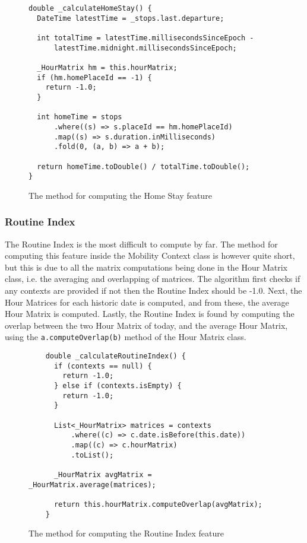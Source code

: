 \begin{figure}
    \centering
\begin{verbatim}
double _calculateHomeStay() {
  DateTime latestTime = _stops.last.departure;

  int totalTime = latestTime.millisecondsSinceEpoch -
      latestTime.midnight.millisecondsSinceEpoch;

  _HourMatrix hm = this.hourMatrix;
  if (hm.homePlaceId == -1) {
    return -1.0;
  }

  int homeTime = stops
      .where((s) => s.placeId == hm.homePlaceId)
      .map((s) => s.duration.inMilliseconds)
      .fold(0, (a, b) => a + b);

  return homeTime.toDouble() / totalTime.toDouble();
}
\end{verbatim}
    \caption{The method for computing the Home Stay feature}
    \label{fig:home-stay-code}
\end{figure}

\subsubsection{Routine Index}
The Routine Index is the most difficult to compute by far. The method for computing this feature inside the Mobility Context class is however quite short, but this is due to all the matrix computations being done in the Hour Matrix class, i.e. the averaging and overlapping of matrices. The algorithm first checks if any contexts are provided if not then the Routine Index should be -1.0. Next, the Hour Matrices for each historic date is computed, and from these, the average Hour Matrix is computed. Lastly, the Routine Index is found by computing the overlap between the two Hour Matrix of today, and the average Hour Matrix, using the \verb|a.computeOverlap(b)| method of the Hour Matrix class.

\begin{figure}
    \centering
    \begin{verbatim}
    double _calculateRoutineIndex() {
      if (contexts == null) {
        return -1.0;
      } else if (contexts.isEmpty) {
        return -1.0;
      }
    
      List<_HourMatrix> matrices = contexts
          .where((c) => c.date.isBefore(this.date))
          .map((c) => c.hourMatrix)
          .toList();
    
      _HourMatrix avgMatrix = _HourMatrix.average(matrices);
    
      return this.hourMatrix.computeOverlap(avgMatrix);
    }
    \end{verbatim}
    \caption{The method for computing the Routine Index feature}
    \label{fig:routine-index-code}
\end{figure}

